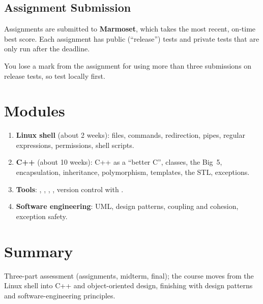 \subsection*{Assignment Submission}
Assignments are submitted to \textbf{Marmoset}, which takes the most recent,
on-time best score. Each assignment has public (``release'') tests and private
tests that are only run after the deadline.

\begin{important}
You lose a mark from the assignment for using more than three submissions on
release tests, so test locally first.
\end{important}

\section{Modules}
\begin{enumerate}
  \item \textbf{Linux shell} (about 2 weeks): files, commands, redirection,
        pipes, regular expressions, permissions, shell scripts.
  \item \textbf{C++} (about 10 weeks): C++ as a ``better C'', classes, the
        Big~5, encapsulation, inheritance, polymorphism, templates, the STL,
        exceptions.
  \item \textbf{Tools}: , , , ,
        version control with .
  \item \textbf{Software engineering}: UML, design patterns, coupling and
        cohesion, exception safety.
\end{enumerate}

\section*{Summary}
Three-part assessment (assignments, midterm, final); the course moves from the
Linux shell into C++ and object-oriented design, finishing with design patterns
and software-engineering principles.
